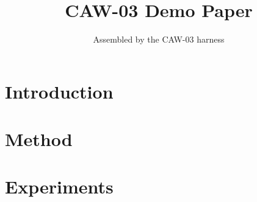 \documentclass{article}
\title{CAW-03 Demo Paper}
\author{Assembled by the CAW-03 harness}
\date{}
\begin{document}
\maketitle

\section{Introduction}

\section{Method}

\section{Experiments}
\end{document}
